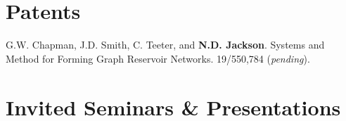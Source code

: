 \documentclass{article}[12pt]
\begin{document}
	
	\renewcommand{\labelenumi}{\theenumi.} 
	
	\section*{Patents}
	
	\begin{etaremune}
		\item G.W. Chapman, J.D. Smith, C. Teeter, and \textbf{N.D. Jackson}. Systems and Method for Forming Graph Reservoir Networks. 19/550,784 (\textit{pending}).
	\end{etaremune}
	
	
	
	
	
	
	
	
	\section*{Invited Seminars \& Presentations}
	
	
\end{document}
